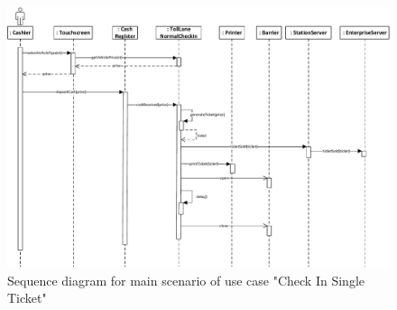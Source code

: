 \begin{figure}[H]
\centerline{\includegraphics[width=1.4\columnwidth]{"img/sequence_diagrams/sequence_diagram_single_ticket_check_in_cash"}}
\caption{Sequence diagram for main scenario of use case "Check In Single Ticket"}
\label{fig:seq_single_ticket_main}
\end{figure}

